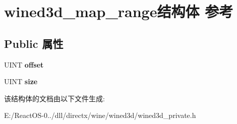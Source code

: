 \hypertarget{structwined3d__map__range}{}\section{wined3d\+\_\+map\+\_\+range结构体 参考}
\label{structwined3d__map__range}
\subsection*{Public 属性}
\begin{DoxyCompactItemize}
\item 
\mbox{\label{structwined3d__map__range_a0b59f45cd3bfcdd492e394a33279c739}} 
U\+I\+NT {\bfseries offset}
\item 
\mbox{\label{structwined3d__map__range_a827e13354378807c6784ddd2bdfb440b}} 
U\+I\+NT {\bfseries size}
\end{DoxyCompactItemize}


该结构体的文档由以下文件生成\+:\begin{DoxyCompactItemize}
\item 
E\+:/\+React\+O\+S-\/0../dll/directx/wine/wined3d/wined3d\+\_\+private.\+h\end{DoxyCompactItemize}
